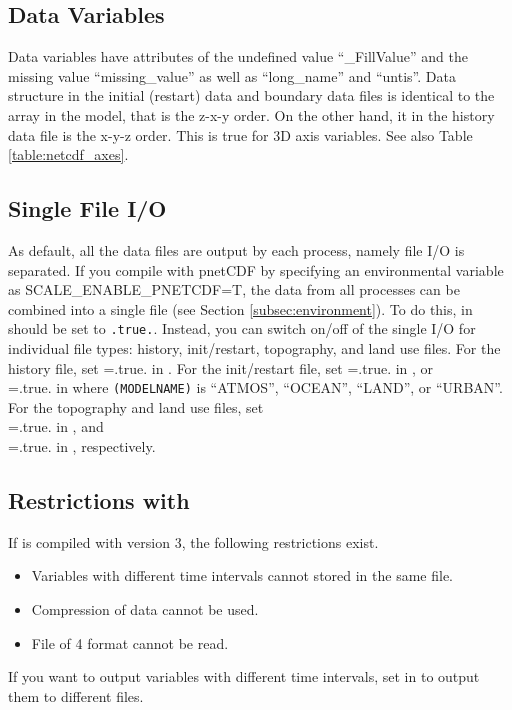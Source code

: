 \subsection{Data Variables}
Data variables have attributes of the undefined value ``\_FillValue'' and 
the missing value ``missing\_value'' as well as ``long\_name'' and ``untis''.
Data structure in the initial (restart) data and boundary data files 
is identical to the array in the model, that is the z-x-y order.
On the other hand, it in the history data file is the x-y-z order.
This is true for 3D axis variables.
See also Table \ref{table:netcdf_axes}.



\subsection{Single File I/O} \label{subsec:single_io}
As default, all the data files are output by each process, namely file I/O is separated.
If you compile \scalerm with pnetCDF by specifying an environmental variable as SCALE\_ENABLE\_PNETCDF=T,
the data from all processes can be combined into a single file (see Section \ref{subsec:environment}).
To do this,  in  should be set to \verb|.true.|.
Instead, you can switch on/off of the single I/O for individual file types: history, init/restart, topography, and land use files. 
For the history file, set =.true. in .
For the init/restart file, set =.true. in , or \\ 
=.true. in  
where \verb|(MODELNAME)| is ``ATMOS'', ``OCEAN'', ``LAND'', or ``URBAN''.
For the topography and land use files, set \\ 
=.true. in , and \\
=.true. in , respectively.


\subsection{Restrictions with }
If \scale is compiled with \netcdf version 3, the following restrictions exist.
\begin{itemize}
\item Variables with different time intervals cannot stored in the same file.
\item Compression of data cannot be used.
\item File of {\netcdf}4 format cannot be read.
\end{itemize}
If you want to output variables with different time intervals, set  in  to output them to different files.

